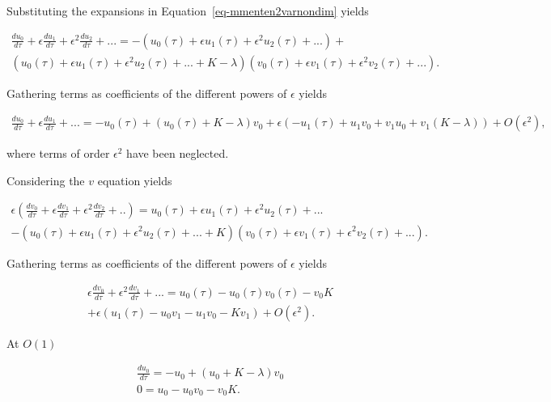 \documentclass[
  letterpaper,
  DIV=11,
  numbers=noendperiod]{scrreprt}
\begin{document}
Substituting the expansions in Equation~\ref{eq-mmenten2varnondim}
yields

\[
\begin{aligned}
\frac{du_0}{d\tau} + \epsilon \frac{du_1}{d\tau} + \epsilon^2\frac{du_2}{d\tau} + ... = -(u_0(\tau) + \epsilon u_1(\tau) + \epsilon^2 u_2(\tau) + ...)+  \nonumber \\ (u_0(\tau) + \epsilon u_1(\tau) + \epsilon^2 u_2(\tau) + ...+ K-\lambda)(v_0(\tau) + \epsilon v_1(\tau) + \epsilon^2 v_2(\tau) + ...).  \nonumber 
\end{aligned}
\]

Gathering terms as coefficients of the different powers of \(\epsilon\)
yields

\[
\begin{aligned}
\frac{du_0}{d\tau} + \epsilon \frac{du_1}{d\tau} + ... = -u_0(\tau)+ (u_0(\tau)+ K-\lambda)v_0  +\epsilon (-u_1(\tau) + u_1v_0+v_1u_0+v_1(K-\lambda)) + O(\epsilon^2), \nonumber
\end{aligned}
\]

where terms of order \(\epsilon^2\) have been neglected.

Considering the \(v\) equation yields

\[
\begin{aligned}
\epsilon(\frac{dv_0}{d\tau} + \epsilon \frac{dv_1}{d\tau} + \epsilon^2\frac{dv_2}{d\tau} + ..) = u_0(\tau) + \epsilon u_1(\tau) + \epsilon^2 u_2(\tau) + ...  \nonumber \\ -(u_0(\tau) + \epsilon u_1(\tau) + \epsilon^2 u_2(\tau) + ...+ K) (v_0(\tau) + \epsilon v_1(\tau) + \epsilon^2 v_2(\tau) + ...).  \nonumber 
\end{aligned}
\]

Gathering terms as coefficients of the different powers of \(\epsilon\)
yields

\[
\begin{aligned}
\epsilon\frac{dv_0}{d\tau} + \epsilon^2 \frac{dv_1}{d\tau} + ... = u_0(\tau)-   u_0(\tau)v_0(\tau) -v_0 K  \nonumber \\ +\epsilon (u_1(\tau) - u_0v_1 - u_1v_0 - Kv_1) + O(\epsilon^2).  \nonumber 
\end{aligned}
\]

At \(O(1)\)

\[
\begin{aligned}
\frac{du_0}{d\tau} = -u_0+ (u_0+ K-\lambda)v_0  \nonumber \\ 
 0= u_0 - u_0 v_0 -v_0K.    \nonumber
\end{aligned}
\]
\end{document}
